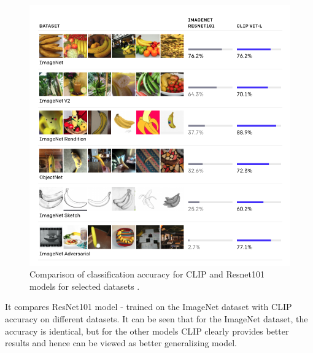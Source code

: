 \documentclass[11pt,a4paper,openany]{book}
\begin{document}
 \begin{figure}[ht!]
     \centering
     \includegraphics[scale=0.5]{figs/clip_summary.png}
     \caption{Comparison of classification accuracy for CLIP and Resnet101 models for selected datasets \cite{clip_blog}.}
 \end{figure}
 \newpage
\noindent It compares ResNet101 model - trained on the ImageNet dataset with CLIP accuracy on different datasets.  It can be seen that for the ImageNet dataset, the accuracy is identical, but for the other models CLIP clearly provides better results and hence can be viewed as better generalizing model.
\newpage
\end{document}
